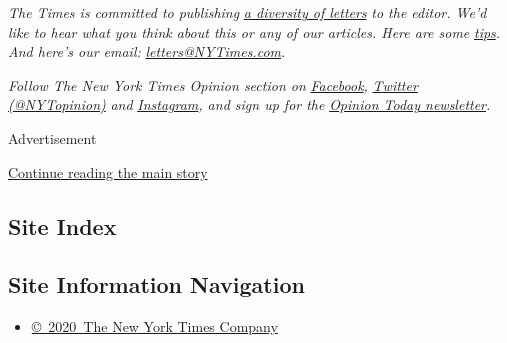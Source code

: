 \emph{The Times is committed to publishing}
\href{https://www.nytimes3xbfgragh.onion/2019/01/31/opinion/letters/letters-to-editor-new-york-times-women.html}{\emph{a
diversity of letters}} \emph{to the editor. We'd like to hear what you
think about this or any of our articles. Here are some}
\href{https://help.nytimes3xbfgragh.onion/hc/en-us/articles/115014925288-How-to-submit-a-letter-to-the-editor}{\emph{tips}}\emph{.
And here's our email:}
\href{mailto:letters@NYTimes.com}{\emph{letters@NYTimes.com}}\emph{.}

\emph{Follow The New York Times Opinion section on}
\href{https://www.facebookcorewwwi.onion/nytopinion}{\emph{Facebook}}\emph{,}
\href{http://twitter.com/NYTOpinion}{\emph{Twitter (@NYTopinion)}}
\emph{and}
\href{https://www.instagram.com/nytopinion/}{\emph{Instagram}}\emph{,
and sign up for the}
\href{http://www.nytimes3xbfgragh.onion/newsletters/opiniontoday/}{\emph{Opinion
Today newsletter}}\emph{.}

Advertisement

\protect\hyperlink{after-bottom}{Continue reading the main story}

\hypertarget{site-index}{%
\subsection{Site Index}\label{site-index}}

\hypertarget{site-information-navigation}{%
\subsection{Site Information
Navigation}\label{site-information-navigation}}

\begin{itemize}
\tightlist
\item
  \href{https://help.nytimes3xbfgragh.onion/hc/en-us/articles/115014792127-Copyright-notice}{©~2020~The
  New York Times Company}
\end{itemize}

